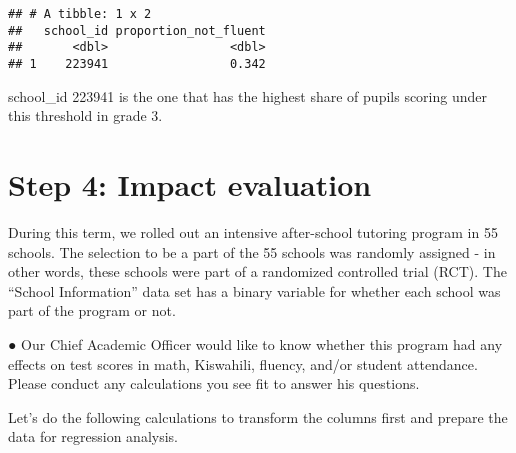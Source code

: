 \documentclass[
]{article}
\newenvironment{Shaded}{\begin{snugshade}}{\end{snugshade}}
\newcommand{\CommentTok}[1]{\textcolor[rgb]{0.56,0.35,0.01}{\textit{#1}}}
\newcommand{\DecValTok}[1]{\textcolor[rgb]{0.00,0.00,0.81}{#1}}
\newcommand{\NormalTok}[1]{#1}
\newcommand{\OtherTok}[1]{\textcolor[rgb]{0.56,0.35,0.01}{#1}}
\newcommand{\SpecialCharTok}[1]{\textcolor[rgb]{0.81,0.36,0.00}{\textbf{#1}}}
\begin{document}
\begin{verbatim}
## # A tibble: 1 x 2
##   school_id proportion_not_fluent
##       <dbl>                 <dbl>
## 1    223941                 0.342
\end{verbatim}

school\_id 223941 is the one that has the highest share of pupils
scoring under this threshold in grade 3.

\hypertarget{step-4-impact-evaluation}{%
\section{Step 4: Impact evaluation}\label{step-4-impact-evaluation}}

During this term, we rolled out an intensive after-school tutoring
program in 55 schools. The selection to be a part of the 55 schools was
randomly assigned - in other words, these schools were part of a
randomized controlled trial (RCT). The ``School Information'' data set
has a binary variable for whether each school was part of the program or
not.

● Our Chief Academic Officer would like to know whether this program had
any effects on test scores in math, Kiswahili, fluency, and/or student
attendance. Please conduct any calculations you see fit to answer his
questions.

Let's do the following calculations to transform the columns first and
prepare the data for regression analysis.

\begin{Shaded}
\end{Shaded}
\end{document}
